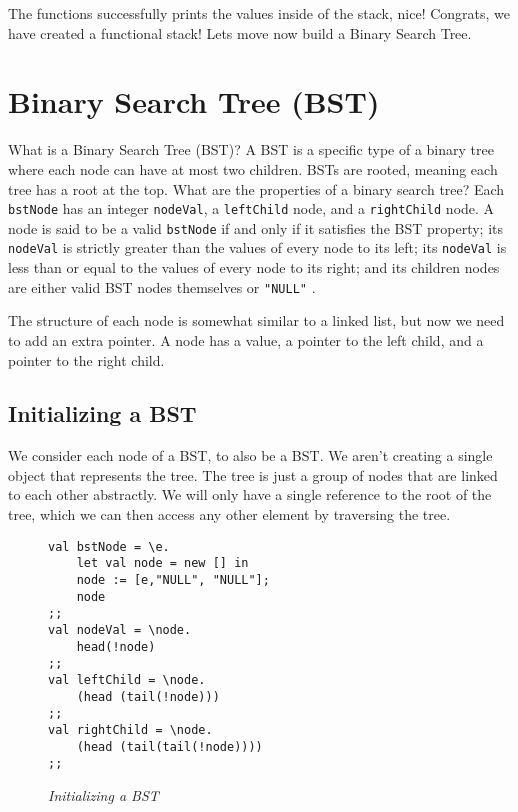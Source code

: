 \documentclass{article}
\begin{document}
\noindent
The functions successfully prints the values inside of the stack, nice! Congrats, we have created a functional stack! Lets move now build a Binary Search Tree.

\section{Binary Search Tree (BST)}

\medskip\noindent
What is a Binary Search Tree (BST)? A BST is a specific type of a binary tree where each node can have at most two children. BSTs are rooted, meaning each tree has a root at the top. What are the properties of a binary search tree? Each \texttt{bstNode} has an integer \texttt{nodeVal}, a \texttt{leftChild} node, and a \texttt{rightChild} node. A node is said to be a valid \texttt{bstNode} if and only if it satisfies the BST property; its \texttt{nodeVal} is strictly greater than the values of every node to its left; its \texttt{nodeVal} is less than or equal to the values of every node to its right; and its children nodes are either valid BST nodes themselves or \texttt{"NULL"} \cite{AlgoExpert}.

\medskip\noindent
The structure of each node is somewhat similar to a linked list, but now we need to add an extra pointer. A node has a value, a pointer to the left child, and a pointer to the right child.

\subsection{Initializing a BST}

\medskip\noindent
We consider each node of a BST, to also be a BST. We aren't creating a single object that represents the tree. The tree is just a group of nodes that are linked to each other abstractly. We will only have a single reference to the root of the tree, which we can then access any other element by traversing the tree. 

\begin{figure}[H]
    \begin{lstlisting}
val bstNode = \e.
    let val node = new [] in
    node := [e,"NULL", "NULL"];
    node
;;
val nodeVal = \node.
    head(!node)
;;
val leftChild = \node.
    (head (tail(!node)))
;;
val rightChild = \node.
    (head (tail(tail(!node)))) 
;;
    \end{lstlisting}
    \caption{\textit{Initializing a BST}}
\end{figure}
\end{document}
